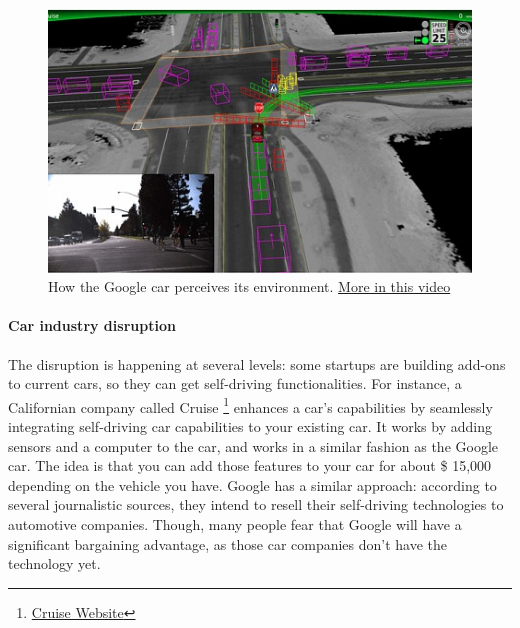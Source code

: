 \documentclass[12pt]{article}
\begin{document}
\smallskip

\begin{figure}[ht]
    \centering
    \includegraphics[width=\linewidth]{google-car}
    \caption{How the Google car perceives its environment.
    \href{https://www.youtube.com/watch?v=dk3oc1Hr62g}{More in this video}}
    \label{fig:google_car}
\end{figure}


\smallskip

\paragraph{Car industry disruption}

The disruption is happening at several levels: some startups are building add-ons
to current cars, so they can get self-driving functionalities. For instance,
a Californian company called Cruise
\footnote{\href{http://www.getcruise.com}{Cruise Website}}
enhances a car's capabilities by seamlessly integrating self-driving car
capabilities to your existing car. It works by adding sensors and a computer to
the car, and works in a similar fashion as the Google car. The idea is that you
can add those features to your car for about \$ 15,000 depending on the vehicle
you have. Google has a similar approach: according to several journalistic
sources, they intend to resell their self-driving technologies to automotive
companies. Though, many people fear that Google will have a significant
bargaining advantage, as those car companies don't have the technology yet.
\end{document}
